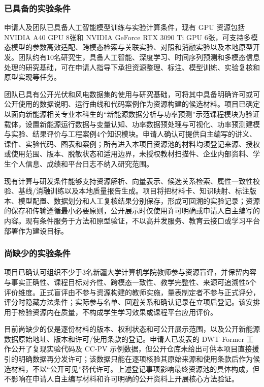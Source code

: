 \justifying
\NSFCBodyText

\subsubsection{已具备的实验条件}

申请人及团队已具备人工智能模型训练与实验计算条件，现有 GPU 资源包括 NVIDIA A40 GPU 8张和 NVIDIA GeForce RTX 3090 Ti GPU 6张，可支持多模态模型的参数高效适配、跨模态检索与关联实验、对照和消融实验以及本地原型开发。团队约有10名研究生，具备人工智能、深度学习、时间序列预测和多模态信息处理的研究基础，可在申请人指导下承担资源整理、标注、模型训练、实验复核和原型实现等任务。

团队已具有公开光伏和风电数据集的使用与研究基础，可将其中具备明确许可或可公开使用的数据说明、运行曲线和代码案例作为资源构建的候选材料。项目已确定以面向新能源相关专业本科生的“新能源数据分析与功率预测”示范课程模块为验证载体，设置新能源运行数据与变量认知、功率数据预处理与可视化、功率预测建模与实验、结果评价与工程案例4个知识模块。申请人确认可提供自主编写的讲义、课件、实验代码、图表和案例；所有进入本项目资源池的材料均须登记来源、授权或使用范围、版本、脱敏状态和适用边界，未授权教材扫描件、企业内部资料、学生个人信息、成绩和平台日志不纳入研究范围。

现有计算与研发条件能够支持资源解析、向量表示、候选关系检索、属性一致性校验、基线/消融训练以及本地质量报告生成。项目将把材料卡、知识映射、标注版本、模型配置、数据划分和人工复核结果分别保存，形成可回溯的实验记录；资源的保存和传输遵循最小必要原则，公开展示时仅使用许可明确或申请人自主编写的内容。现有条件服务于方法和原型验证，不以高并发服务、教育云接口或学习平台部署作为建设目标。

\subsubsection{尚缺少的实验条件}

项目已确认可组织不少于3名新疆大学计算机学院教师参与资源盲评，并保留内容与事实正确性、课程目标对齐性、跨模态一致性、教学完整性、来源可追溯性5个评价维度。正式盲评由不参与资源构建的教师实施，量表制定者不参与正式评分，评分时隐藏方法条件；实际参与名单、回避关系和确认记录在立项后登记。该安排用于检验资源内在质量，不构成学生学习效果或课程平台应用评价。

目前尚缺少的仅是逐份材料的版本、权利状态和可公开展示范围，以及公开新能源数据原始地址、版本和许可/使用条款的登记。申请人已发表的 DWT-Former 工作公开了复现实验代码及 CC-PV 示例数据，但公开仓库未给出可供本项目直接援引的明确数据再分发许可；该数据只能在逐项核验其原始来源和使用条款后作为候选材料，不以“公开可见”替代许可。上述登记事项影响最终资源池的具体构成，但不影响在申请人自主编写材料和许可明确的公开资料上开展核心方法验证。

